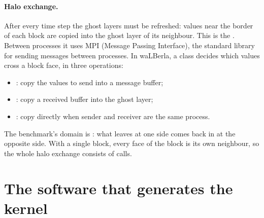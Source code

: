 \paragraph{Halo exchange.} After every time step the ghost layers must be refreshed: values
near the border of each block are copied into the ghost layer of its neighbour. This is the
. Between processes it uses MPI (Message Passing Interface), the standard
library for sending messages between processes. In waLBerla, a  class
decides which values cross a block face, in three operations:
\begin{itemize}
  \item {}: copy the values to send into a message buffer;
  \item {}: copy a received buffer into the ghost layer;
  \item {}: copy directly when sender and receiver are the same process.
\end{itemize}
The benchmark's domain is : what leaves at one side comes back in at the
opposite side. With a single block, every face of the block is its own neighbour, so the
whole halo exchange consists of  calls.

\section{The software that generates the kernel}\label{r03:sec:bg-stack}

